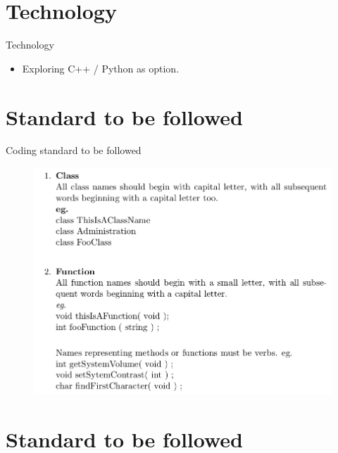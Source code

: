 \documentclass[color=usenames,dvipsnames]{beamer}
\begin{document}
\section{Technology}

\begin{frame}{Technology}

\begin{itemize}
  \setlength{\itemsep}{10pt}
  
  \item Exploring C++ / Python as option. 

  
\end{itemize}

\end{frame}

 


\section{Standard to be followed}

\begin{frame}{Coding standard to be followed}

\begin{figure}[h!]  
  \centering
  \includegraphics[width=.85\textwidth]{1.png}  
  \end{figure} 
\end{frame}

\section{Standard to be followed}
\end{document}

